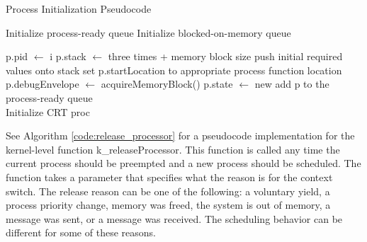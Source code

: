 \documentclass[12pt]{report}
\begin{document}
    \begin{algorithm}
        \caption{Process Initialization Pseudocode}
        \label{code:proc_init}
        \begin{algorithmic}[1]
            \State Initialize process-ready queue
            \State Initialize blocked-on-memory queue

                \State p.pid $\gets$ i
                \State p.stack $\gets$  three times + memory block size 
                \State push initial required values onto stack
                \State set p.startLocation to appropriate process function location
                \State p.debugEnvelope $\gets$ acquireMemoryBlock()
                \State p.state $\gets$ new
                \State add p to the process-ready queue
            \EndFor \\
            \State Initialize CRT proc
        \EndFunction
        \end{algorithmic}
    \end{algorithm}

    See Algorithm \ref{code:release_processor} for a pseudocode implementation
    for the kernel-level function k\_releaseProcessor. This function is called
    any time the current process should be preempted and a new process should be
    scheduled. The function takes a parameter that specifies what the reason is
    for the context switch. The release reason can be one of the following: a
    voluntary yield, a process priority change, memory was freed, the system is
    out of memory, a message was sent, or a message was received. The scheduling
    behavior can be different for some of these reasons.
\end{document}

